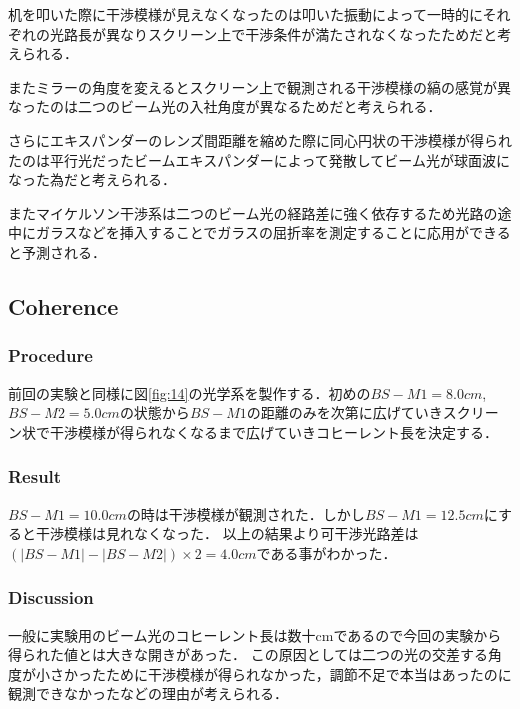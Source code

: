 \documentclass[11pt, a4paper]{jsarticle}
\begin{document}
机を叩いた際に干渉模様が見えなくなったのは叩いた振動によって一時的にそれぞれの光路長が異なりスクリーン上で干渉条件が満たされなくなったためだと考えられる．

またミラーの角度を変えるとスクリーン上で観測される干渉模様の縞の感覚が異なったのは二つのビーム光の入社角度が異なるためだと考えられる．

さらにエキスパンダーのレンズ間距離を縮めた際に同心円状の干渉模様が得られたのは平行光だったビームエキスパンダーによって発散してビーム光が球面波になった為だと考えられる．

またマイケルソン干渉系は二つのビーム光の経路差に強く依存するため光路の途中にガラスなどを挿入することでガラスの屈折率を測定することに応用ができると予測される．

\subsection{Coherence}
\subsubsection{Procedure}
前回の実験と同様に図\ref{fig:14}の光学系を製作する．初めの$BS-M1 = 8.0cm$,$BS-M2 = 5.0cm$の状態から$BS-M1$の距離のみを次第に広げていきスクリーン状で干渉模様が得られなくなるまで広げていきコヒーレント長を決定する．
\subsubsection{Result}
$BS-M1 = 10.0cm$の時は干渉模様が観測された．しかし$BS-M1 = 12.5cm$にすると干渉模様は見れなくなった．
以上の結果より可干渉光路差は$(|BS-M1|-|BS-M2|) \times 2 = 4.0cm$である事がわかった．
\subsubsection{Discussion}
一般に実験用のビーム光のコヒーレント長は数十cmであるので今回の実験から得られた値とは大きな開きがあった．
この原因としては二つの光の交差する角度が小さかったために干渉模様が得られなかった，調節不足で本当はあったのに観測できなかったなどの理由が考えられる．

\newpage
\end{document}
